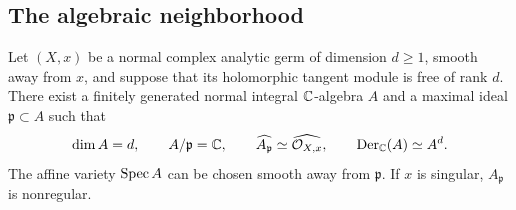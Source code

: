 \subsection{The algebraic neighborhood}

\begin{proposition}
\label{prop:algebraization}
Let $(X,x)$ be a normal complex analytic germ of dimension $d\ge1$,
smooth away from $x$, and suppose that its holomorphic tangent module
is free of rank $d$.  There exist a finitely generated normal integral
$\mathbb C$-algebra $A$ and a maximal ideal $\mathfrak p\subset A$ such that
\[
 \dim A=d,\qquad A/\mathfrak p=\mathbb C,\qquad
 \widehat{A_{\mathfrak p}}\simeq\widehat{\mathcal O_{X,x}},\qquad
 \operatorname{Der}_{\mathbb C}(A)\simeq A^d.
\]
The affine variety $\operatorname{Spec} A$ can be chosen smooth away from
$\mathfrak p$.  If $x$ is singular, $A_{\mathfrak p}$ is nonregular.
\end{proposition}

